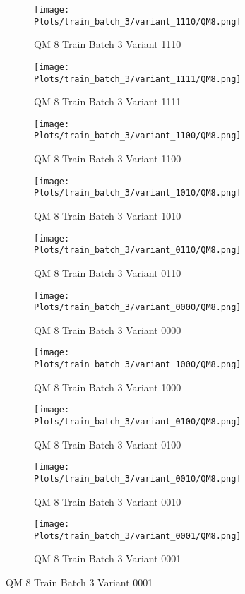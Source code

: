 \documentclass{DissertateFigs}
\begin{document}
\begin{figure}[t!]
    \begin{subfigure}{0.38\textwidth}
    \texttt{[image: Plots/train\_batch\_3/variant\_1110/QM8.png]}
    \caption{QM 8 Train Batch 3 Variant 1110}
    \end{subfigure}
    \begin{subfigure}{0.38\textwidth}
    \texttt{[image: Plots/train\_batch\_3/variant\_1111/QM8.png]}
    \caption{QM 8 Train Batch 3 Variant 1111}
    \end{subfigure}

\medskip

    \begin{subfigure}{0.38\textwidth}
    \texttt{[image: Plots/train\_batch\_3/variant\_1100/QM8.png]}
    \caption{QM 8 Train Batch 3 Variant 1100}
    \end{subfigure}
    \begin{subfigure}{0.38\textwidth}
    \texttt{[image: Plots/train\_batch\_3/variant\_1010/QM8.png]}
    \caption{QM 8 Train Batch 3 Variant 1010}
    \end{subfigure}

\medskip

    \begin{subfigure}{0.38\textwidth}
    \texttt{[image: Plots/train\_batch\_3/variant\_0110/QM8.png]}
    \caption{QM 8 Train Batch 3 Variant 0110}
    \end{subfigure}
    \begin{subfigure}{0.38\textwidth}
    \texttt{[image: Plots/train\_batch\_3/variant\_0000/QM8.png]}
    \caption{QM 8 Train Batch 3 Variant 0000}
    \end{subfigure}

\medskip

    \begin{subfigure}{0.38\textwidth}
    \texttt{[image: Plots/train\_batch\_3/variant\_1000/QM8.png]}
    \caption{QM 8 Train Batch 3 Variant 1000}
    \end{subfigure}
    \begin{subfigure}{0.38\textwidth}
    \texttt{[image: Plots/train\_batch\_3/variant\_0100/QM8.png]}
    \caption{QM 8 Train Batch 3 Variant 0100}
    \end{subfigure}

\medskip

    \begin{subfigure}{0.38\textwidth}
    \texttt{[image: Plots/train\_batch\_3/variant\_0010/QM8.png]}
    \caption{QM 8 Train Batch 3 Variant 0010}
    \end{subfigure}
    \begin{subfigure}{0.38\textwidth}
    \texttt{[image: Plots/train\_batch\_3/variant\_0001/QM8.png]}
    \caption{QM 8 Train Batch 3 Variant 0001}
    \end{subfigure}


\end{figure}
\end{document}
